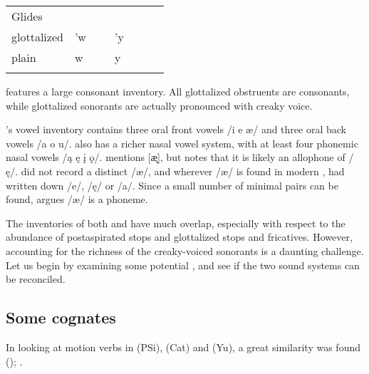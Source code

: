 \documentclass[output=paper]{LSP/langsci}
\begin{document}
\begin{table}[p]
\begin{tabular}{llllll}
 Glides           & ~                   & ~                    & ~                       & ~                   & ~                \\
glottalized                 & 'w                  & ~                    & 'y                      & ~                   & ~                \\
plain                       & w                   & ~                    & y                       & ~                   & ~                \\ \lspbottomrule
\end{tabular}
\end{table}

 features a large consonant inventory. All glottalized obstruents are  consonants, while glottalized sonorants are actually pronounced with creaky voice. 

's vowel inventory contains three oral front vowels /i e \ae/ and three oral back vowels /a o u/.  also has a richer nasal vowel system, with at least four phonemic nasal vowels /\k{a} \k{e} \k{i} \k{o}/. \citet{Linn2000} mentions [\k{\ae}], but notes that it is likely an allophone of /\k{e}/. \citet{Wagner1934} did not record a distinct /\ae/, and wherever /\ae/ is found in modern , \citet{Wagner1934} had written down /e/, /\k{e}/ or /a/. Since a small number of minimal pairs can be found, \citet[44]{Linn2000} argues /\ae/ is a phoneme.

The inventories of both  and  have much overlap, especially with respect to the abundance of postaspirated stops and glottalized stops and fricatives. However, accounting for the richness of the creaky-voiced sonorants is a daunting challenge. Let us begin by examining some potential , and see if the two sound systems can be reconciled.

\subsection{Some cognates}
 
In looking at motion verbs in  (PSi),  (Cat) and  (Yu), a great similarity was found (\citealt{Kasak2013}); .
\end{document}
